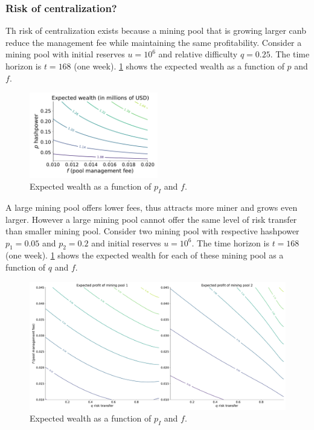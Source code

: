 \subsubsection{Risk of centralization?}\label{ssec:numerical_illustrations}
Th risk of centralization exists because a mining pool that is growing larger canb reduce the management fee while maintaining the same profitability. Consider a mining pool with initial reserves $u = 10^6$ and relative difficulty $q=0.25$. The time horizon is $t = 168$ (one week). \cref{fig:level_plot_V_pool_manager_p_f} shows the expected wealth as a function of $p$ and $f$.  
\begin{figure}[!ht]
  \begin{center}
      \includegraphics[width = 0.5\textwidth]{../Figures/level_plot_V_pool_manager_p_f}
    \caption{Expected wealth as a function of $p_I$ and $f$.}
    \label{fig:level_plot_V_pool_manager_p_f}
  \end{center}
\end{figure}
A large mining pool offers lower fees, thus attracts more miner and grows even larger. However a large mining pool cannot offer the same level of risk transfer than smaller mining pool. Consider two mining pool with respective hashpower $p_1 = 0.05$ and $p_2 = 0.2$ and initial reserves $u = 10^6$. The time horizon is $t = 168$ (one week). \cref{fig:level_plot_V_pool_manager_p_f} shows the expected wealth for each of these mining pool as a function of $q$ and $f$.  
\begin{figure}[!ht]
  \begin{center}
      \includegraphics[width = \textwidth]{../Figures/level_plots_V_pool_manager_q_f}
    \caption{Expected wealth as a function of $p_I$ and $f$.}
    \label{fig:level_plots_V_pool_manager_q_f}
  \end{center}
\end{figure}

